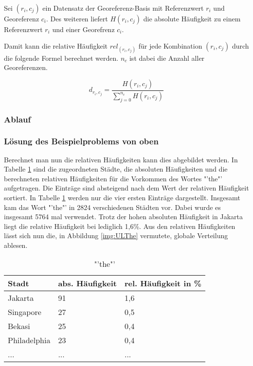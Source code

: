 				Sei $(r_i,c_j)$ ein Datensatz der Georeferenz-Basis mit Referenzwert $r_i$ und Georeferenz $c_i$.
				Des weiteren liefert $H(r_{i},c_{j})$ die absolute Häufigkeit zu einem Referenzwert $r_i$ und einer Georefrenz $c_i$. 

				Damit kann die relative Häufigkeit $rel_{(r_i,c_j)}$ für jede Kombination $(r_i,c_j)$ durch die folgende Formel berechnet werden. 
				$n_c$ ist dabei die Anzahl aller Georeferenzen.

				\begin{equation}
					d_{r_i,c_j}=\frac{H(r_i,c_j)}{\sum^{n_c}_{j=0}{H(r_i,c_j)}}
				\end{equation}	

			\subsubsection{Ablauf}

			\subsubsection{Lösung des Beispielproblems von oben}

				Berechnet man nun die relativen Häufigkeiten kann dies abgebildet werden.
				In Tabelle \ref{tab:the} sind die zugeordneten Städte, die absoluten Häufigkeiten und die berechneten relativen Häufigkeiten für die Vorkommen des Wortes "'the"' aufgetragen. 
				Die Einträge sind absteigend nach dem Wert der relativen Häufigkeit sortiert.
				In Tabelle \ref{tab:the} werden nur die vier ersten Einträge dargestellt.  
				Insgesamt kam das Wort "'the"' in 2824 verschiedenen Städten vor.
				Dabei wurde es insgesamt 5764 mal verwendet. 
				Trotz der hohen absoluten Häufigkeit in Jakarta liegt die relative Häufigkeit bei lediglich 1,6\%.
				Aus den relativen Häufigkeiten lässt sich nun die, in Abbildung \ref{img:ULThe} vermutete, globale Verteilung ablesen.


				\begin{table}[h]
				\centering
				\caption{"'the"'}
				\label{tab:the}
				\begin{tabular}{|l|l|l|}
				\hline
				Stadt             & abs. Häufigkeit & rel. Häufigkeit in \% \\ \hline \hline
				Jakarta           & 91              & 1,6                       \\ \hline
				Singapore         & 27              & 0,5                       \\ \hline
				Bekasi            & 25              & 0,4                       \\ \hline
				Philadelphia      & 23              & 0,4                       \\ \hline
				... & ... & ... \\ \hline
				\end{tabular}
				\end{table}

